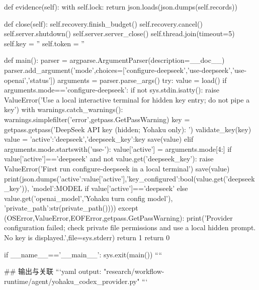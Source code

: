     def evidence(self):
        with self.lock:
            return json.loads(json.dumps(self.records))

    def close(self):
        self.recovery.finish_budget()
        self.recovery.cancel()
        self.server.shutdown()
        self.server.server_close()
        self.thread.join(timeout=5)
        self.key = ''
        self.token = ''


def main():
    parser = argparse.ArgumentParser(description=__doc__)
    parser.add_argument('mode',choices=['configure-deepseek','use-deepseek','use-openai','status'])
    arguments = parser.parse_args()
    try:
        value = load()
        if arguments.mode=='configure-deepseek':
            if not sys.stdin.isatty():
                raise ValueError('Use a local interactive terminal for hidden key entry; do not pipe a key')
            with warnings.catch_warnings():
                warnings.simplefilter('error',getpass.GetPassWarning)
                key = getpass.getpass('DeepSeek API key (hidden; Yohaku only): ')
            validate_key(key)
            value = {'active':'deepseek','deepseek_key':key}
            save(value)
        elif arguments.mode.startswith('use-'):
            value['active'] = arguments.mode[4:]
            if value['active']=='deepseek' and not value.get('deepseek_key'):
                raise ValueError('First run configure-deepseek in a local terminal')
            save(value)
        print(json.dumps({'active':value['active'],'key_configured':bool(value.get('deepseek_key')),
                          'model':MODEL if value['active']=='deepseek' else value.get('openai_model','Yohaku turn config model'),
                          'private_path':str(private_path())}))
    except (OSError,ValueError,EOFError,getpass.GetPassWarning):
        print('Provider configuration failed; check private file permissions and use a local hidden prompt. No key is displayed.',file=sys.stderr)
        return 1
    return 0


if __name__=='__main__':
    sys.exit(main())
````

## 输出与关联
```yaml
output: "research/workflow-runtime/agent/yohaku_codex_provider.py"
```
